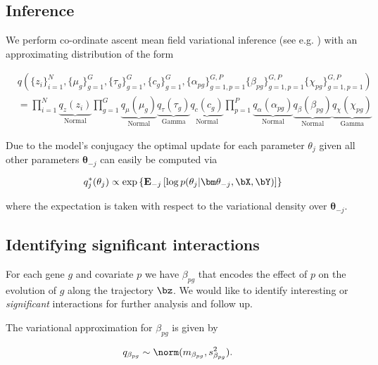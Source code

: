 \subsection{Inference}

We perform co-ordinate ascent mean field variational inference (see e.g. \cite{blei2016variational}) with an approximating distribution of the form

\begin{equation}
\begin{aligned}
& q\left(
\{ z_i \}_{i=1}^N,
\{ \mu_g \}_{g=1}^G,
\{ \tau_g \}_{g=1}^G,
\{ c_g \}_{g=1}^G,
\{ \alpha_{pg} \}_{g=1,p=1}^{G,P}
\{ \beta_{pg} \}_{g=1,p=1}^{G,P}
\{ \chi_{pg} \}_{g=1,p=1}^{G,P}
\right) \\
& = \prod_{i=1}^N \underbrace{q_z(z_i)}_{\text{Normal}}
\prod_{g=1}^G \underbrace{q_\mu(\mu_g)}_{\text{Normal}}
\underbrace{q_\tau(\tau_g)}_{\text{Gamma}} \underbrace{q_c(c_g)}_{\text{Normal}}
\prod_{p=1}^P \underbrace{q_\alpha (\alpha_{pg})}_{\text{Normal}}
\underbrace{q_\beta(\beta_{pg})}_{\text{Normal}} \underbrace{q_\chi (\chi_{pg})}_{\text{Gamma}}
\end{aligned}
\end{equation}

Due to the model's conjugacy the optimal update for each parameter $\theta_j$ given all other parameters $\bm \theta_{-j}$ can easily be computed via

\begin{equation}
q^*_j(\theta_j) \propto \exp \left\{  \mathbf{E}_{-j} \left[ \log p(\theta_j | \bm \theta_{-j}, \bX, \bY) \right]
 \right\}
\end{equation}

%
where the expectation is taken with respect to the variational density over $\bm \theta_{-j}$.


\subsection{Identifying significant interactions} \label{sec:significant}

For each gene $g$ and covariate $p$ we have $\beta_{pg}$ that encodes the effect of $p$ on the evolution of $g$ along the trajectory $\bz$. We would like to identify interesting or \emph{significant} interactions for further analysis and follow up.

The variational approximation for $\beta_{pg}$ is given by

\begin{equation}
\begin{aligned}
q_{\beta_{pg}} & \sim \norm(m_{\beta_{pg}}, s^2_{\beta_{pg}}) .
\end{aligned}
\end{equation}

